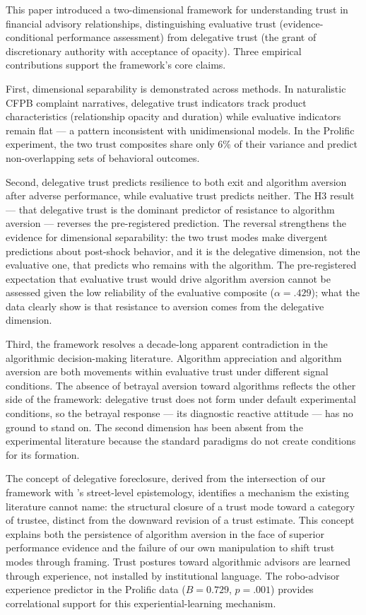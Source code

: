 This paper introduced a two-dimensional framework for understanding trust in financial advisory relationships, distinguishing evaluative trust (evidence-conditional performance assessment) from delegative trust (the grant of discretionary authority with acceptance of opacity). Three empirical contributions support the framework's core claims.

First, dimensional separability is demonstrated across methods. In naturalistic CFPB complaint narratives, delegative trust indicators track product characteristics (relationship opacity and duration) while evaluative indicators remain flat --- a pattern inconsistent with unidimensional models. In the Prolific experiment, the two trust composites share only 6\% of their variance and predict non-overlapping sets of behavioral outcomes.

Second, delegative trust predicts resilience to both exit and algorithm aversion after adverse performance, while evaluative trust predicts neither. The H3 result --- that delegative trust is the dominant predictor of resistance to algorithm aversion --- reverses the pre-registered prediction. The reversal strengthens the evidence for dimensional separability: the two trust modes make divergent predictions about post-shock behavior, and it is the delegative dimension, not the evaluative one, that predicts who remains with the algorithm. The pre-registered expectation that evaluative trust would drive algorithm aversion cannot be assessed given the low reliability of the evaluative composite ($\alpha = .429$); what the data clearly show is that resistance to aversion comes from the delegative dimension.

Third, the framework resolves a decade-long apparent contradiction in the algorithmic decision-making literature. Algorithm appreciation \citep{LoggMinsonMoore2019} and algorithm aversion \citep{DietvorstSimmonsMassey2015} are both movements within evaluative trust under different signal conditions. The absence of betrayal aversion toward algorithms \citep{kormylo2026} reflects the other side of the framework: delegative trust does not form under default experimental conditions, so the betrayal response --- its diagnostic reactive attitude --- has no ground to stand on. The second dimension has been absent from the experimental literature because the standard paradigms do not create conditions for its formation.

The concept of delegative foreclosure, derived from the intersection of our framework with \citeauthor{hardin1993street}'s \citeyearpar{hardin1993street} street-level epistemology, identifies a mechanism the existing literature cannot name: the structural closure of a trust mode toward a category of trustee, distinct from the downward revision of a trust estimate. This concept explains both the persistence of algorithm aversion in the face of superior performance evidence and the failure of our own manipulation to shift trust modes through framing. Trust postures toward algorithmic advisors are learned through experience, not installed by institutional language. The robo-advisor experience predictor in the Prolific data ($B = 0.729$, $p = .001$) provides correlational support for this experiential-learning mechanism.

